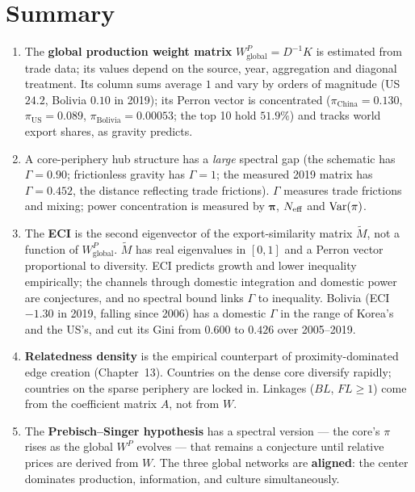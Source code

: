 \documentclass[../structural_economics_book.tex]{subfiles}
\begin{document}
\section{Summary}
\label{ch16:sec:summary}

\begin{enumerate}
\item The \textbf{global production weight matrix} $W^P_{\text{global}} = D^{-1}K$ is estimated from trade data; its values depend on the source, year, aggregation and diagonal treatment. Its column sums average $1$ and vary by orders of magnitude (US $24.2$, Bolivia $0.10$ in 2019); its Perron vector is concentrated ($\pi_{\text{China}} = 0.130$, $\pi_{\text{US}} = 0.089$, $\pi_{\text{Bolivia}} = 0.00053$; the top 10 hold $51.9\%$) and tracks world export shares, as gravity predicts.

\item A core-periphery hub structure has a \emph{large} spectral gap (the schematic has $\Gamma = 0.90$; frictionless gravity has $\Gamma = 1$; the measured 2019 matrix has $\Gamma = 0.452$, the distance reflecting trade frictions). $\Gamma$ measures trade frictions and mixing; power concentration is measured by $\boldsymbol{\pi}$, $N_{\text{eff}}$ and $\operatorname{Var}(\pi)$.

\item The \textbf{ECI} is the second eigenvector of the export-similarity matrix $\tilde{M}$, not a function of $W^P_{\text{global}}$. $\tilde{M}$ has real eigenvalues in $[0,1]$ and a Perron vector proportional to diversity. ECI predicts growth and lower inequality empirically; the channels through domestic integration and domestic power are conjectures, and no spectral bound links $\Gamma$ to inequality. Bolivia (ECI $-1.30$ in 2019, falling since 2006) has a domestic $\Gamma$ in the range of Korea's and the US's, and cut its Gini from $0.600$ to $0.426$ over 2005--2019.

\item \textbf{Relatedness density} is the empirical counterpart of proximity-dominated edge creation (Chapter~13). Countries on the dense core diversify rapidly; countries on the sparse periphery are locked in. Linkages ($BL$, $FL \geq 1$) come from the coefficient matrix $A$, not from $W$.

\item The \textbf{Prebisch--Singer hypothesis} has a spectral version --- the core's $\pi$ rises as the global $W^P$ evolves --- that remains a conjecture until relative prices are derived from $W$. The three global networks are \textbf{aligned}: the center dominates production, information, and culture simultaneously.
\end{enumerate}
\end{document}
